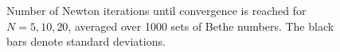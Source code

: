 \documentclass[11pt, a4paper]{report} %
\begin{document}
\begin{figure}[ph]
  \centering
  \\
  \\
  \caption{Number of Newton iterations until convergence is reached for \(N=5,10,20\), averaged over 1000 sets of Bethe numbers. The black bars denote standard deviations.}
  \label{fig:iterations}
\end{figure}
\end{document}
